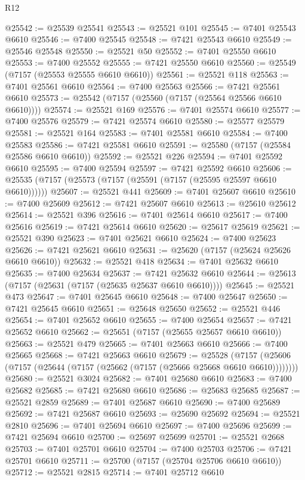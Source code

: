 \begin{lexlean}{R12}
\begin{coremodule}
@25542 := @25539 @25541
@25543 := @25521 @101
@25545 := @7401 @25543 @6610
@25546 := @7400 @25545
@25548 := @7421 @25543 @6610
@25549 := @25546 @25548
@25550 := @25521 @50
@25552 := @7401 @25550 @6610
@25553 := @7400 @25552
@25555 := @7421 @25550 @6610
@25560 := @25549 (@7157 (@25553 @25555 @6610 @6610))
@25561 := @25521 @118
@25563 := @7401 @25561 @6610
@25564 := @7400 @25563
@25566 := @7421 @25561 @6610
@25573 := @25542 (@7157 (@25560 (@7157 (@25564 @25566 @6610 @6610))))
@25574 := @25521 @169
@25576 := @7401 @25574 @6610
@25577 := @7400 @25576
@25579 := @7421 @25574 @6610
@25580 := @25577 @25579
@25581 := @25521 @164
@25583 := @7401 @25581 @6610
@25584 := @7400 @25583
@25586 := @7421 @25581 @6610
@25591 := @25580 (@7157 (@25584 @25586 @6610 @6610))
@25592 := @25521 @226
@25594 := @7401 @25592 @6610
@25595 := @7400 @25594
@25597 := @7421 @25592 @6610
@25606 := @25535 (@7157 (@25573 (@7157 (@25591 (@7157 (@25595 @25597 @6610 @6610))))))
@25607 := @25521 @441
@25609 := @7401 @25607 @6610
@25610 := @7400 @25609
@25612 := @7421 @25607 @6610
@25613 := @25610 @25612
@25614 := @25521 @396
@25616 := @7401 @25614 @6610
@25617 := @7400 @25616
@25619 := @7421 @25614 @6610
@25620 := @25617 @25619
@25621 := @25521 @390
@25623 := @7401 @25621 @6610
@25624 := @7400 @25623
@25626 := @7421 @25621 @6610
@25631 := @25620 (@7157 (@25624 @25626 @6610 @6610))
@25632 := @25521 @418
@25634 := @7401 @25632 @6610
@25635 := @7400 @25634
@25637 := @7421 @25632 @6610
@25644 := @25613 (@7157 (@25631 (@7157 (@25635 @25637 @6610 @6610))))
@25645 := @25521 @473
@25647 := @7401 @25645 @6610
@25648 := @7400 @25647
@25650 := @7421 @25645 @6610
@25651 := @25648 @25650
@25652 := @25521 @446
@25654 := @7401 @25652 @6610
@25655 := @7400 @25654
@25657 := @7421 @25652 @6610
@25662 := @25651 (@7157 (@25655 @25657 @6610 @6610))
@25663 := @25521 @479
@25665 := @7401 @25663 @6610
@25666 := @7400 @25665
@25668 := @7421 @25663 @6610
@25679 := @25528
    (@7157 (@25606 (@7157 (@25644 (@7157 (@25662 (@7157 (@25666 @25668 @6610 @6610))))))))
@25680 := @25521 @3024
@25682 := @7401 @25680 @6610
@25683 := @7400 @25682
@25685 := @7421 @25680 @6610
@25686 := @25683 @25685
@25687 := @25521 @2859
@25689 := @7401 @25687 @6610
@25690 := @7400 @25689
@25692 := @7421 @25687 @6610
@25693 := @25690 @25692
@25694 := @25521 @2810
@25696 := @7401 @25694 @6610
@25697 := @7400 @25696
@25699 := @7421 @25694 @6610
@25700 := @25697 @25699
@25701 := @25521 @2668
@25703 := @7401 @25701 @6610
@25704 := @7400 @25703
@25706 := @7421 @25701 @6610
@25711 := @25700 (@7157 (@25704 @25706 @6610 @6610))
@25712 := @25521 @2815
@25714 := @7401 @25712 @6610

\end{coremodule}
\end{lexlean}
